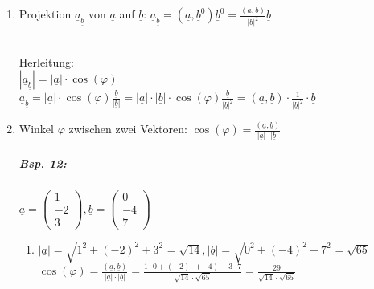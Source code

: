\begin{enumerate}
\item Projektion $\underline{a}_{\underline{b}}$ von $\underline{a}$ auf $\underline{b}$: $\boxed{\underline{a}_{\underline{b}}=(\underline{a}, \underline{b}^0)\underline{b}^0=\frac{(\underline{a}, \underline{b})}{|\underline{b}|^2}\underline{b}}$\\
\\
Herleitung:\\
$|\underline{a}_{\underline{b}}|=|\underline{a}|\cdot \cos(\varphi)$\\
$\underline{a}_{\underline{b}}=|\underline{a}|\cdot \cos(\varphi)\frac{\underline{b}}{|\underline{b}|}=|\underline{a}| \cdot |\underline{b}| \cdot \cos(\varphi) \frac{\underline{b}}{|\underline{b}|^2}=(\underline{a}, \underline{b})\cdot \frac{1}{|\underline{b}|^2}\cdot \underline{b}$
\item Winkel $\varphi$ zwischen zwei Vektoren: $\boxed{\cos(\varphi)=\frac{(\underline{a}, \underline{b})}{|\underline{a}|\cdot |\underline{b}|}}$
\subparagraph{Bsp. 12:} \parskp
$\underline{a}=\begin{pmatrix}
1\\
-2\\
3
\end{pmatrix}, \underline{b}=\begin{pmatrix}
0\\
-4\\
7
\end{pmatrix}$
\begin{enumerate} [label=\alph*.)]
\item $|\underline{a}| = \sqrt{1^2+(-2)^2+3^2}=\sqrt{14}, |\underline{b}|=\sqrt{0^2+(-4)^2+7^2}=\sqrt{65}$\\
$\cos(\varphi)=\frac{(\underline{a}, \underline{b})}{|\underline{a}|\cdot |\underline{b}|}=\frac{1 \cdot 0 + (-2) \cdot (-4) + 3\cdot 7}{\sqrt{14} \cdot \sqrt{65}}=\frac{29}{\sqrt{14} \cdot \sqrt{65}}$\\

\end{enumerate}
\end{enumerate}
